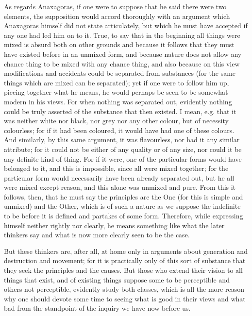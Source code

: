 \documentclass{article}
\begin{document}
As regards Anaxagoras, if one were to suppose that he said there were two elements, the supposition would accord thoroughly with an argument which Anaxagoras himself did not state articulately, but which he must have accepted if any one had led him on to it. True, to say that in the beginning all things were mixed is absurd both on other grounds and because it follows that they must have existed before in an unmixed form, and because nature does not allow any chance thing to be mixed with any chance thing, and also because on this view modifications and accidents could be separated from substances (for the same things which are mixed can be separated); yet if one were to follow him up, piecing together what he means, he would perhaps be seen to be somewhat modern in his views. For when nothing was separated out, evidently nothing could be truly asserted of the substance that then existed. I mean, e.g. that it was neither white nor black, nor grey nor any other colour, but of necessity colourless; for if it had been coloured, it would have had one of these colours. And similarly, by this same argument, it was flavourless, nor had it any similar attribute; for it could not be either of any quality or of any size, nor could it be any definite kind of thing. For if it were, one of the particular forms would have belonged to it, and this is impossible, since all were mixed together; for the particular form would necessarily have been already separated out, but he all were mixed except reason, and this alone was unmixed and pure. From this it follows, then, that he must say the principles are the One (for this is simple and unmixed) and the Other, which is of such a nature as we suppose the indefinite to be before it is defined and partakes of some form. Therefore, while expressing himself neither rightly nor clearly, he means something like what the later thinkers say and what is now more clearly seen to be the case.

But these thinkers are, after all, at home only in arguments about generation and destruction and movement; for it is practically only of this sort of substance that they seek the principles and the causes. But those who extend their vision to all things that exist, and of existing things suppose some to be perceptible and others not perceptible, evidently study both classes, which is all the more reason why one should devote some time to seeing what is good in their views and what bad from the standpoint of the inquiry we have now before us.
\end{document}
